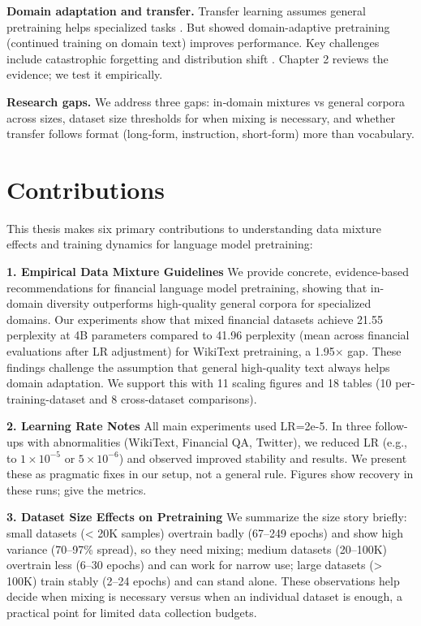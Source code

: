\textbf{Domain adaptation and transfer.} Transfer learning assumes general pretraining helps specialized tasks \parencite{devlin2019bert, pan2010transfer}. But \textcite{gururangan2020don} showed domain-adaptive pretraining (continued training on domain text) improves performance. Key challenges include catastrophic forgetting \parencite{kirkpatrick2017overcoming} and distribution shift \parencite{quinonero2009dataset}. Chapter 2 reviews the evidence; we test it empirically.

\textbf{Research gaps.} We address three gaps: in‑domain mixtures vs general corpora across sizes, dataset size thresholds for when mixing is necessary, and whether transfer follows format (long‑form, instruction, short‑form) more than vocabulary.

\section{Contributions}

This thesis makes six primary contributions to understanding data mixture effects and training dynamics for language model pretraining:

\textbf{1. Empirical Data Mixture Guidelines}
We provide concrete, evidence-based recommendations for financial language model pretraining, showing that in-domain diversity outperforms high-quality general corpora for specialized domains. Our experiments show that mixed financial datasets achieve 21.55 perplexity at 4B parameters compared to 41.96 perplexity (mean across financial evaluations after LR adjustment) for WikiText pretraining, a 1.95$\times$ gap. These findings challenge the assumption that general high-quality text always helps domain adaptation. We support this with 11 scaling figures and 18 tables (10 per-training-dataset and 8 cross-dataset comparisons).

\textbf{2. Learning Rate Notes}
All main experiments used LR=2e-5. In three follow-ups with abnormalities (WikiText, Financial QA, Twitter), we reduced LR (e.g., to $1\times10^{-5}$ or $5\times10^{-6}$) and observed improved stability and results. We present these as pragmatic fixes in our setup, not a general rule. Figures  show recovery in these runs;  give the metrics.

\textbf{3. Dataset Size Effects on Pretraining}
We summarize the size story briefly: small datasets (< 20K samples) overtrain badly (67–249 epochs) and show high variance (70–97\% spread), so they need mixing; medium datasets (20–100K) overtrain less (6–30 epochs) and can work for narrow use; large datasets (> 100K) train stably (2–24 epochs) and can stand alone. These observations help decide when mixing is necessary versus when an individual dataset is enough, a practical point for limited data collection budgets.


